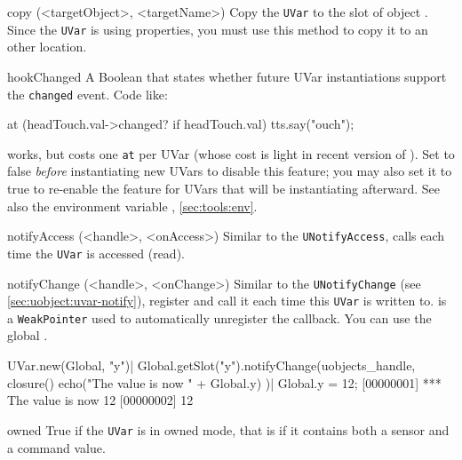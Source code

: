 \begin{urbiscriptapi}

\item[copy](<targetObject>, <targetName>)
  Copy the \lstinline|UVar| to the slot  of object
  . Since the \lstinline|UVar| is using properties, you must
  use this method to copy it to an other location.

\item[hookChanged]%
  A Boolean that states whether future UVar instantiations support the
  \lstinline|changed| event.  Code like:

\begin{urbiunchecked}
at (headTouch.val->changed? if headTouch.val)
  tts.say("ouch");
\end{urbiunchecked}
  \noindent
  works, but costs one \lstinline|at| per UVar (whose cost is light in
  recent version of \usdk).  Set  to false
  \emph{before} instantiating new UVars to disable this feature; you may
  also set it to true to re-enable the feature for UVars that will be
  instantiating afterward.  See also the environment variable
  , \autoref{sec:tools:env}.

\item[notifyAccess](<handle>, <onAccess>)%
  Similar to the \Cxx \lstinline|UNotifyAccess|, calls  each
  time the \lstinline|UVar| is accessed (read).

\item[notifyChange](<handle>, <onChange>)
  Similar to the \Cxx \lstinline|UNotifyChange|
  (see \autoref{sec:uobject:uvar-notify}), register  and
  call it each time this \lstinline|UVar| is written to.
   is a \lstinline|WeakPointer| used to automatically unregister
  the callback. You can use the global .
\begin{urbiscript}
UVar.new(Global, "y")|
Global.getSlot("y").notifyChange(uobjects_handle, closure() {
  echo("The value is now " + Global.y)
})|
Global.y = 12;
[00000001] *** The value is now 12
[00000002] 12
\end{urbiscript}

\item[owned]
  True if the \lstinline|UVar| is in owned mode, that is if it contains both a
  sensor and a command value.

\end{urbiscriptapi}

